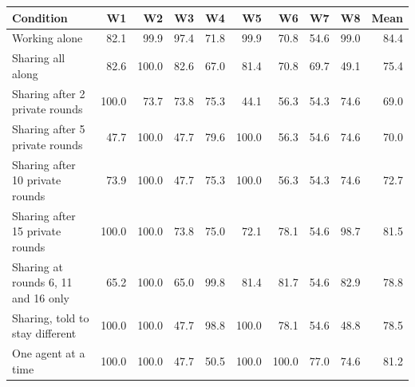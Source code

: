 \begin{tabular}{l rrrrrrrr r}
\toprule
Condition & W1 & W2 & W3 & W4 & W5 & W6 & W7 & W8 & Mean \\
\midrule
Working alone & 82.1 & 99.9 & 97.4 & 71.8 & 99.9 & 70.8 & 54.6 & 99.0 & 84.4 \\
Sharing all along & 82.6 & 100.0 & 82.6 & 67.0 & 81.4 & 70.8 & 69.7 & 49.1 & 75.4 \\
Sharing after 2 private rounds & 100.0 & 73.7 & 73.8 & 75.3 & 44.1 & 56.3 & 54.3 & 74.6 & 69.0 \\
Sharing after 5 private rounds & 47.7 & 100.0 & 47.7 & 79.6 & 100.0 & 56.3 & 54.6 & 74.6 & 70.0 \\
Sharing after 10 private rounds & 73.9 & 100.0 & 47.7 & 75.3 & 100.0 & 56.3 & 54.3 & 74.6 & 72.7 \\
Sharing after 15 private rounds & 100.0 & 100.0 & 73.8 & 75.0 & 72.1 & 78.1 & 54.6 & 98.7 & 81.5 \\
Sharing at rounds 6, 11 and 16 only & 65.2 & 100.0 & 65.0 & 99.8 & 81.4 & 81.7 & 54.6 & 82.9 & 78.8 \\
Sharing, told to stay different & 100.0 & 100.0 & 47.7 & 98.8 & 100.0 & 78.1 & 54.6 & 48.8 & 78.5 \\
One agent at a time & 100.0 & 100.0 & 47.7 & 50.5 & 100.0 & 100.0 & 77.0 & 74.6 & 81.2 \\
\bottomrule
\end{tabular}